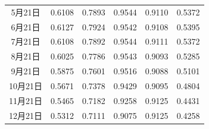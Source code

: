 \documentclass[withoutpreface,bwprint]{cumcmthesis}
\begin{document}
\begin{appendices}
\begin{table}[!htbp]
\begin{tabular}{cccccc}
 			5月21日  & 0.6108                                            & 0.7893                                            & 0.9544                                              & 0.9110                                            & 0.5372                                                         \\
 			6月21日  & 0.6127                                            & 0.7924                                            & 0.9542                                              & 0.9108                                            & 0.5395                                                         \\
 			7月21日  & 0.6108                                            & 0.7892                                            & 0.9544                                              & 0.9111                                            & 0.5372                                                         \\
 			8月21日  & 0.6025                                            & 0.7786                                            & 0.9543                                              & 0.9093                                            & 0.5285                                                         \\
 			9月21日  & 0.5875                                            & 0.7601                                            & 0.9516                                              & 0.9088                                            & 0.5101                                                         \\
 			10月21日 & 0.5671                                            & 0.7378                                            & 0.9429                                              & 0.9095                                            & 0.4804                                                         \\
 			11月21日 & 0.5465                                            & 0.7182                                            & 0.9258                                              & 0.9125                                            & 0.4431                                                         \\
 			12月21日 & 0.5312                                            & 0.7111                                            & 0.9075                                              & 0.9125                                            & 0.4258                                                         \\ \hline
 		\end{tabular}
 	\end{table}
 	

\end{appendices}
\end{document}
